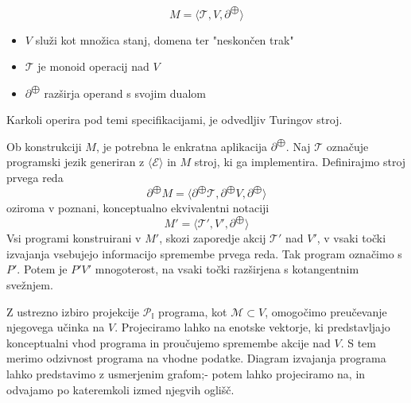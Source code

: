 \documentclass{article}
\newcommand{\II}{\mathbb{I}}
\newcommand{\E}{\mathcal{E}}
\newcommand{\T}{\mathcal{T}}
\newcommand{\Op}{\partial^{\bigoplus}}
\begin{document}
  \begin{equation}\label{eq:dTuring}
  M=\langle\T, V, \partial^{\bigoplus}\rangle
  \end{equation}

 \begin{itemize}
 \item
 $V$ služi kot množica stanj, domena ter "neskončen trak"
 \item
 $\T$ je monoid operacij nad $V$
 \item
 $\partial^{\bigoplus}$ razširja operand s svojim dualom 
 \end{itemize}
 
 Karkoli operira pod temi specifikacijami, je odvedljiv Turingov stroj.
 
 Ob konstrukciji $M$, je potrebna le enkratna aplikacija $\Op$. Naj $\T$ označuje programski jezik generiran z $\langle\E\rangle$ in $M$ stroj, ki ga implementira. Definirajmo stroj prvega reda
 \begin{equation}\label{eq:Mprime}
	 \Op M=\langle\Op\T, \Op V, \Op\rangle
 \end{equation}
 oziroma v poznani, konceptualno ekvivalentni notaciji
  \begin{equation}\label{eq:M'}
 	 M'=\langle\T', V', \Op\rangle
  \end{equation}
  Vsi programi konstruirani v $M'$, skozi zaporedje akcij $\T'$ nad $V'$, v vsaki točki izvajanja vsebujejo informacijo spremembe prvega reda. Tak program označimo s $P'$. Potem je $P'V'$ mnogoterost, na vsaki točki razširjena s kotangentnim svežnjem.
 
 Z ustrezno izbiro projekcije $\mathcal{P}_\II$ programa, kot $\mathcal{M}\subset V$, omogočimo preučevanje njegovega učinka na $V$. Projeciramo lahko na enotske vektorje, ki predstavljajo konceptualni vhod programa in proučujemo spremembe akcije nad $V$. S tem merimo odzivnost programa na vhodne podatke. Diagram izvajanja programa lahko predstavimo z usmerjenim grafom;- potem lahko projeciramo na, in odvajamo po kateremkoli izmed njegvih oglišč.
 
\end{document}
